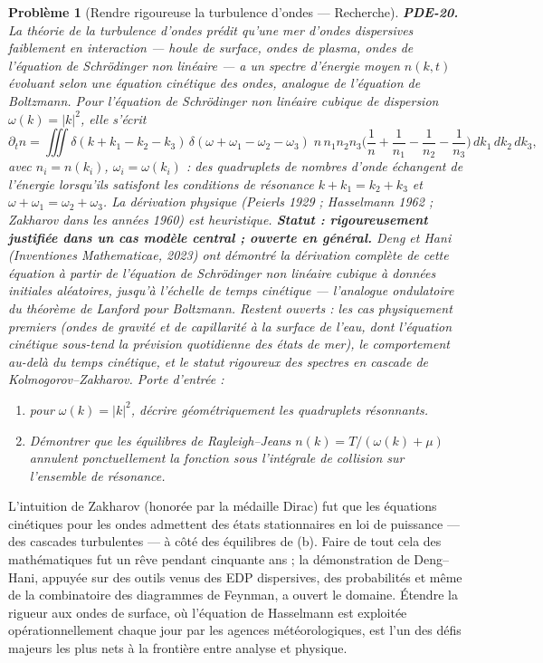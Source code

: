\documentclass[11pt]{article}
\newtheorem{problem}{Problème}
\begin{document}
\begin{problem}[{Rendre rigoureuse la turbulence d'ondes --- Recherche}]
\textbf{PDE-20.} La théorie de la turbulence d'ondes prédit qu'une mer
d'ondes dispersives faiblement en interaction --- houle de surface, ondes de plasma, ondes de
l'équation de Schrödinger non linéaire --- a un spectre d'énergie moyen $n(k,t)$
évoluant selon une \textit{équation cinétique des ondes}, analogue de l'équation de Boltzmann.
Pour l'équation de Schrödinger non linéaire cubique de dispersion $\omega(k) = |k|^2$, elle
s'écrit
\[ \partial_t n = \iiint \delta(k + k_1 - k_2 - k_3)\,
\delta(\omega + \omega_1 - \omega_2 - \omega_3)\;
n\,n_1 n_2 n_3 \Big( \frac{1}{n} + \frac{1}{n_1} - \frac{1}{n_2} - \frac{1}{n_3} \Big)
\,dk_1\,dk_2\,dk_3, \]
avec $n_i = n(k_i)$, $\omega_i = \omega(k_i)$ : des quadruplets de nombres d'onde
échangent de l'énergie lorsqu'ils satisfont les conditions de résonance
$k + k_1 = k_2 + k_3$ et $\omega + \omega_1 = \omega_2 + \omega_3$. La
dérivation physique (Peierls 1929 ; Hasselmann 1962 ; Zakharov dans les années 1960) est
heuristique.
\textbf{Statut : rigoureusement justifiée dans un cas modèle central ; ouverte en général.}
Deng et Hani (Inventiones Mathematicae, 2023) ont démontré la dérivation complète de cette
équation à partir de l'équation de Schrödinger non linéaire cubique à données initiales
aléatoires, jusqu'à l'échelle de temps cinétique --- l'analogue ondulatoire du théorème de Lanford
pour Boltzmann. Restent ouverts : les cas physiquement premiers (ondes de gravité et de
capillarité à la surface de l'eau, dont l'équation cinétique sous-tend la prévision quotidienne
des états de mer), le comportement au-delà du temps cinétique, et le statut rigoureux des spectres
en cascade de Kolmogorov--Zakharov. Porte d'entrée :
\begin{enumerate}
\item[(a)] pour $\omega(k) = |k|^2$, décrire géométriquement les quadruplets
résonnants.
\item[(b)] Démontrer que les équilibres de Rayleigh--Jeans
$n(k) = T/(\omega(k) + \mu)$ annulent ponctuellement la fonction sous l'intégrale de collision
sur l'ensemble de résonance.
\end{enumerate}

\end{problem}

\noindent L'intuition de Zakharov (honorée par la médaille Dirac) fut que les
équations cinétiques pour les ondes admettent des états stationnaires en loi de puissance --- des
cascades turbulentes --- à côté des équilibres de (b). Faire de tout cela des mathématiques fut un
rêve pendant cinquante ans ; la démonstration de Deng--Hani, appuyée sur des outils venus des EDP
dispersives, des probabilités et même de la combinatoire des diagrammes de Feynman, a ouvert le
domaine. Étendre la rigueur aux ondes de surface, où l'équation de Hasselmann est exploitée
opérationnellement chaque jour par les agences météorologiques, est l'un des défis majeurs les
plus nets à la frontière entre analyse et physique.
\end{document}
